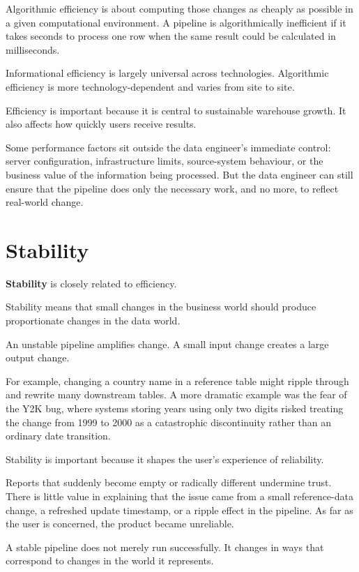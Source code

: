 \documentclass[10pt,openany,10pt]{book}
\begin{document}
Algorithmic efficiency is about computing those changes as cheaply as
possible in a given computational environment. A pipeline is
algorithmically inefficient if it takes seconds to process one row when
the same result could be calculated in milliseconds.

Informational efficiency is largely universal across technologies.
Algorithmic efficiency is more technology-dependent and varies from site
to site.

Efficiency is important because it is central to sustainable warehouse
growth. It also affects how quickly users receive results.

Some performance factors sit outside the data engineer's immediate
control: server configuration, infrastructure limits, source-system
behaviour, or the business value of the information being processed. But
the data engineer can still ensure that the pipeline does only the
necessary work, and no more, to reflect real-world change.

\section{Stability}\label{stability-1}

\textbf{Stability} is closely related to efficiency.

Stability means that small changes in the business world should produce
proportionate changes in the data world.

An unstable pipeline amplifies change. A small input change creates a
large output change.

For example, changing a country name in a reference table might ripple
through and rewrite many downstream tables. A more dramatic example was
the fear of the Y2K bug, where systems storing years using only two
digits risked treating the change from 1999 to 2000 as a catastrophic
discontinuity rather than an ordinary date transition.

Stability is important because it shapes the user's experience of
reliability.

Reports that suddenly become empty or radically different undermine
trust. There is little value in explaining that the issue came from a
small reference-data change, a refreshed update timestamp, or a ripple
effect in the pipeline. As far as the user is concerned, the product
became unreliable.

A stable pipeline does not merely run successfully. It changes in ways
that correspond to changes in the world it represents.
\end{document}
